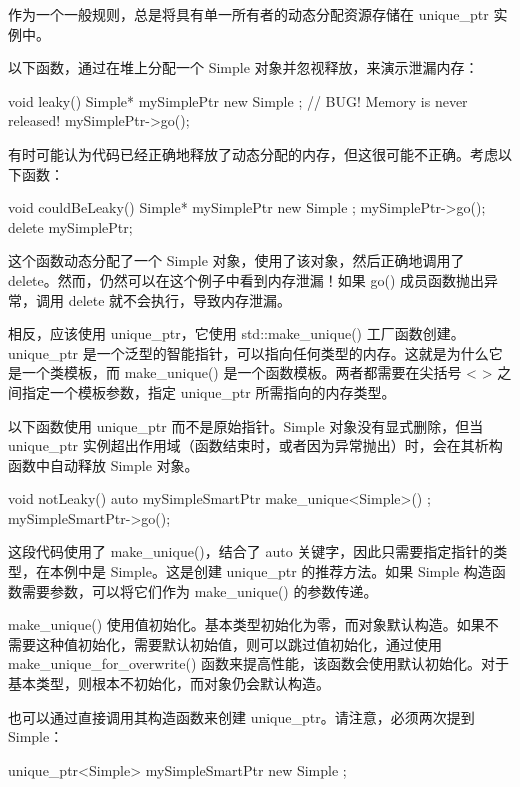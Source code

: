 作为一个一般规则，总是将具有单一所有者的动态分配资源存储在 unique\_ptr 实例中。


以下函数，通过在堆上分配一个 Simple 对象并忽视释放，来演示泄漏内存：

\begin{cpp}
void leaky()
{
    Simple* mySimplePtr { new Simple{} }; // BUG! Memory is never released!
    mySimplePtr->go();
}
\end{cpp}

有时可能认为代码已经正确地释放了动态分配的内存，但这很可能不正确。考虑以下函数：

\begin{cpp}
void couldBeLeaky()
{
    Simple* mySimplePtr { new Simple{} };
    mySimplePtr->go();
    delete mySimplePtr;
}
\end{cpp}

这个函数动态分配了一个 Simple 对象，使用了该对象，然后正确地调用了 delete。然而，仍然可以在这个例子中看到内存泄漏！如果 go() 成员函数抛出异常，调用 delete 就不会执行，导致内存泄漏。

相反，应该使用 unique\_ptr，它使用 std::make\_unique() 工厂函数创建。unique\_ptr 是一个泛型的智能指针，可以指向任何类型的内存。这就是为什么它是一个类模板，而 make\_unique() 是一个函数模板。两者都需要在尖括号 < > 之间指定一个模板参数，指定 unique\_ptr 所需指向的内存类型。

以下函数使用 unique\_ptr 而不是原始指针。Simple 对象没有显式删除，但当 unique\_ptr 实例超出作用域（函数结束时，或者因为异常抛出）时，会在其析构函数中自动释放 Simple 对象。

\begin{cpp}
void notLeaky()
{
    auto mySimpleSmartPtr { make_unique<Simple>() };
    mySimpleSmartPtr->go();
}
\end{cpp}

这段代码使用了 make\_unique()，结合了 auto 关键字，因此只需要指定指针的类型，在本例中是 Simple。这是创建 unique\_ptr 的推荐方法。如果 Simple 构造函数需要参数，可以将它们作为 make\_unique() 的参数传递。

make\_unique() 使用值初始化。基本类型初始化为零，而对象默认构造。如果不需要这种值初始化，需要默认初始值，则可以跳过值初始化，通过使用 make\_unique\_for\_overwrite() 函数来提高性能，该函数会使用默认初始化。对于基本类型，则根本不初始化，而对象仍会默认构造。

也可以通过直接调用其构造函数来创建 unique\_ptr。请注意，必须两次提到 Simple：

\begin{cpp}
unique_ptr<Simple> mySimpleSmartPtr { new Simple{} };
\end{cpp}

